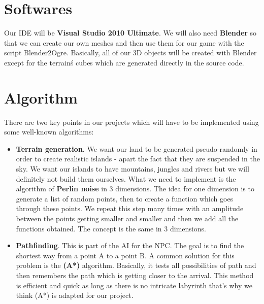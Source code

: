 \documentclass[article]{report} %
\begin{document}
						\section{Softwares}
							Our \ac{IDE} will be \textbf{Visual Studio 2010 Ultimate}. We will also need \textbf{Blender} so that we can create our own meshes and then use them for our game with the script Blender2Ogre. Basically, all of our 3D objects will be created with Blender except for the terrain\'s cubes which are generated directly in the source code.
						\section{Algorithm}
							
							There are two key points in our projects which will have to be implemented using some well-known algorithms:
							\begin{itemize}
									\item \textbf{Terrain generation}. We want our land to be generated pseudo-randomly in order to create realistic islands - apart the fact that they are suspended in the sky. We want our islands to have mountains, jungles and rivers but we will definitely not build them ourselves. What we need to implement is the algorithm of \textbf{Perlin noise} in 3 dimensions. The idea for one dimension is to generate a list of random points, then to create a function which goes through these points. We repeat this step many times with an amplitude between the points getting smaller and smaller and then we add all the functions obtained. The concept is the same in 3 dimensions.\\

									\item \textbf{Pathfinding}. This is part of the \ac{AI} for the \ac{NPC}. The goal is to find the shortest way from a point A to a point B. A common solution for this problem is the \textbf{(A*)} algorithm. Basically, it tests all possibilities of path and then remembers the path which is getting closer to the arrival. This method is efficient and quick as long as there is no intricate labyrinth that’s why we think (A*) is adapted for our project.
							\end{itemize}

							\begin{acronym}
							\end{acronym}
     	     		
\end{document}
